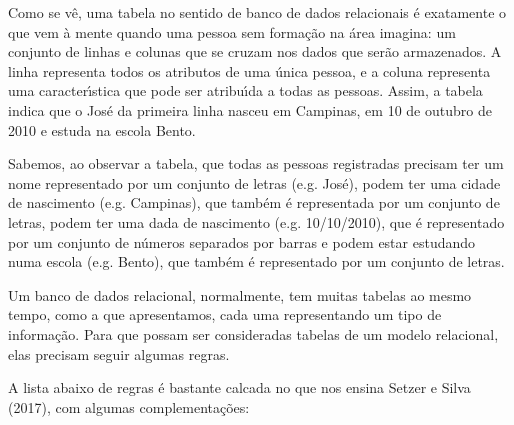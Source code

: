 \documentclass[
12pt,		%
openright,	%
twoside,  %
a4paper,			%
chapter=TITLE,		%
english,			%
french,				%
spanish,			%
brazil				%
]{USPSC-classe/USPSC}
\begin{document}
Como se v\^e, uma tabela no sentido de banco de dados relacionais \'e exatamente o que vem \`a mente quando uma pessoa sem forma\c{c}\~ao na \'area imagina: um conjunto de linhas e colunas que se cruzam nos dados que ser\~ao armazenados. A linha representa todos os atributos de uma \'unica pessoa, e a coluna representa uma caracter\'{\i}stica que pode ser atribu\'{\i}da a todas as pessoas. Assim, a tabela indica que o  Jos\'e da primeira linha nasceu em Campinas, em 10 de outubro de 2010 e estuda na escola Bento.










Sabemos, ao observar a tabela, que todas as pessoas registradas precisam ter um nome representado por um conjunto de letras (e.g. Jos\'e), podem ter uma cidade de nascimento (e.g. Campinas), que tamb\'em \'e representada por um conjunto de letras, podem ter uma dada de nascimento (e.g. 10/10/2010), que \'e representado por um conjunto de n\'umeros separados por barras e podem estar estudando numa escola (e.g. Bento), que tamb\'em \'e representado por um conjunto de letras.










Um banco de dados relacional, normalmente, tem muitas tabelas ao mesmo tempo, como a que apresentamos, cada uma representando um tipo de informa\c{c}\~ao. Para que possam ser consideradas tabelas de um modelo relacional, elas precisam seguir algumas regras.










A lista abaixo de regras \'e bastante calcada no que nos ensina  Setzer e Silva (2017), com algumas complementa\c{c}\~oes:
\end{document}

